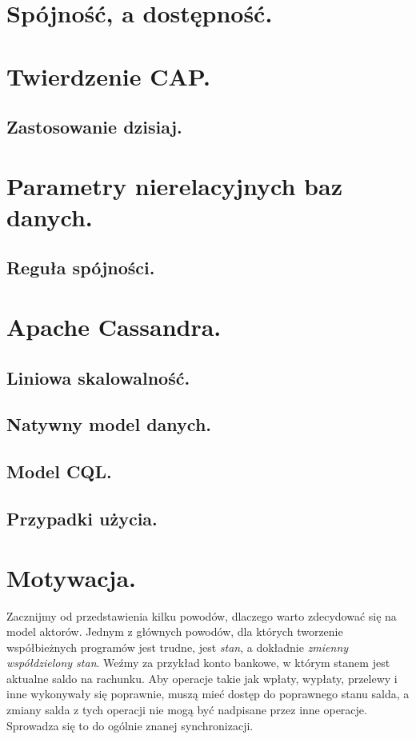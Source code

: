 \documentclass[oneside, 11pt, a4paper]{article}
\begin{document}
\begin{multicols}{2}
\section{Spójność, a dostępność.}

\section{Twierdzenie CAP.}

\subsection{Zastosowanie dzisiaj.}

\section{Parametry nierelacyjnych baz danych.}

\subsection{Reguła spójności.}

\section{Apache Cassandra.}

\subsection{Liniowa skalowalność.}

\subsection{Natywny model danych.}

\subsection{Model CQL.}

\subsection{Przypadki użycia.}

\section{Motywacja.}

Zacznijmy od przedstawienia kilku powodów, dlaczego warto zdecydować się na model aktorów.
Jednym z głównych powodów, dla których tworzenie współbieżnych programów jest trudne, jest \emph{stan}, a dokładnie \emph{zmienny współdzielony stan}. Weźmy za przykład konto bankowe, w którym stanem jest aktualne saldo na rachunku. Aby operacje takie jak wpłaty, wypłaty, przelewy i inne wykonywały się poprawnie, muszą mieć dostęp do poprawnego stanu salda, a zmiany salda z tych operacji nie mogą być nadpisane przez inne operacje. Sprowadza się to do ogólnie znanej synchronizacji.


\end{multicols}
\end{document}
